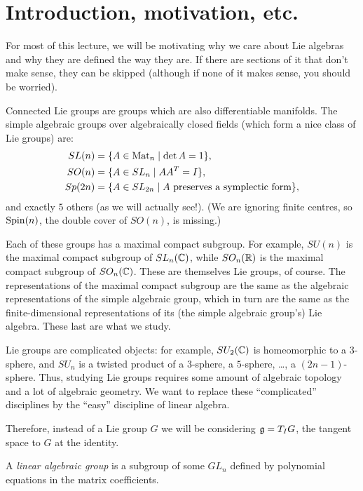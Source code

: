 \section{Introduction, motivation, etc.}

 For most of this lecture, we will be motivating why we care about
Lie algebras and why they are defined the way they are. If there are sections
of it that don't make sense, they can be skipped (although if none of it makes
sense, you should be worried).

Connected Lie groups are groups which are also differentiable manifolds. The
simple algebraic groups over algebraically closed fields (which form a nice
class of Lie groups) are:
\begin{align*}
  SL(n) &= \{A \in \operatorname{Mat}_n \mid \det A = 1\},\\
  SO(n) &= \{A \in SL_n \mid AA^T = I\},\\
  Sp(2n) &= \{A \in SL_{2n} \mid A \text{ preserves a symplectic form}\},
\end{align*}
and exactly $5$ others (as we will actually see!). (We are ignoring finite
centres, so $\operatorname{Spin}(n)$, the double cover of $SO(n)$, is missing.)

\begin{remark}
Each of these groups has a maximal compact subgroup. For example, $SU(n)$ is
the maximal compact subgroup of $SL_n(\mathbb{C})$, while $SO_n(\mathbb{R})$ is the maximal
compact subgroup of $SO_n(\mathbb{C})$. These are themselves Lie groups, of course.
The representations of the maximal compact subgroup are the same as the
algebraic representations of the simple algebraic group, which in turn are the
same as the finite-dimensional representations of its (the simple algebraic
group's) Lie algebra. These last are what we study.
\end{remark}

Lie groups are complicated objects: for example, $SU_2(\mathbb{C})$ is homeomorphic to
a $3$-sphere, and $SU_n$ is a twisted product of a $3$-sphere, a $5$-sphere,
\dots, a $(2n-1)$-sphere. Thus, studying Lie groups requires some amount of
algebraic topology and a lot of algebraic geometry. We want to replace these
``complicated'' disciplines by the ``easy'' discipline of linear algebra.

Therefore, instead of a Lie group $G$ we will be considering $\mathfrak{g} = T_IG$, the
tangent space to $G$ at the identity.

\begin{definition}
A \emph{linear algebraic group} is a subgroup of some $GL_n$ defined by
polynomial equations in the matrix coefficients.
\end{definition}


